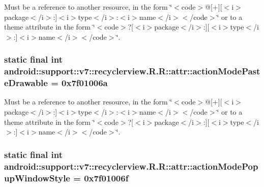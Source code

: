Must be a reference to another resource, in the form \char`\"{}$<$code$>$@\mbox{[}+\mbox{]}\mbox{[}$<$i$>$package$<$/i$>$:\mbox{]}$<$i$>$type$<$/i$>$:$<$i$>$name$<$/i$>$$<$/code$>$\char`\"{} or to a theme attribute in the form \char`\"{}$<$code$>$?\mbox{[}$<$i$>$package$<$/i$>$:\mbox{]}\mbox{[}$<$i$>$type$<$/i$>$:\mbox{]}$<$i$>$name$<$/i$>$$<$/code$>$\char`\"{}. \hypertarget{classandroid_1_1support_1_1v7_1_1recyclerview_1_1_r_1_1attr_7f898988415972b99589b13e88ff0bc8}{
\subsubsection[{actionModePasteDrawable}]{\setlength{\rightskip}{0pt plus 5cm}static final int android::support::v7::recyclerview.R.R::attr::actionModePasteDrawable = 0x7f01006a}}
\label{classandroid_1_1support_1_1v7_1_1recyclerview_1_1_r_1_1attr_7f898988415972b99589b13e88ff0bc8}


Must be a reference to another resource, in the form \char`\"{}$<$code$>$@\mbox{[}+\mbox{]}\mbox{[}$<$i$>$package$<$/i$>$:\mbox{]}$<$i$>$type$<$/i$>$:$<$i$>$name$<$/i$>$$<$/code$>$\char`\"{} or to a theme attribute in the form \char`\"{}$<$code$>$?\mbox{[}$<$i$>$package$<$/i$>$:\mbox{]}\mbox{[}$<$i$>$type$<$/i$>$:\mbox{]}$<$i$>$name$<$/i$>$$<$/code$>$\char`\"{}. \hypertarget{classandroid_1_1support_1_1v7_1_1recyclerview_1_1_r_1_1attr_66145b7adb791497065c0f562eeecf2d}{
\subsubsection[{actionModePopupWindowStyle}]{\setlength{\rightskip}{0pt plus 5cm}static final int android::support::v7::recyclerview.R.R::attr::actionModePopupWindowStyle = 0x7f01006f}}
\label{classandroid_1_1support_1_1v7_1_1recyclerview_1_1_r_1_1attr_66145b7adb791497065c0f562eeecf2d}


